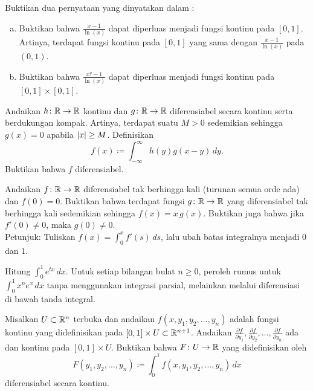 \begin{exercise} \label{exercise:counterexamplediffunder}
Buktikan dua pernyataan yang dinyatakan dalam
:
\begin{enumerate}[a)]
\item
Buktikan bahwa $\frac{x-1}{\ln(x)}$ dapat diperluas menjadi fungsi kontinu pada
$[0,1]$.  Artinya, terdapat fungsi kontinu pada $[0,1]$
yang sama dengan $\frac{x-1}{\ln(x)}$ pada $(0,1)$.
\item
Buktikan bahwa $\frac{x^y-1}{\ln(x)}$ dapat diperluas menjadi fungsi kontinu
pada $[0,1] \times [0,1]$.
\end{enumerate}
\end{exercise}

\begin{exercise}
Andaikan $h \colon {\mathbb{R}} \to {\mathbb{R}}$ kontinu dan $g
\colon {\mathbb{R}} \to {\mathbb{R}}$ diferensiabel secara kontinu serta berdukungan
kompak.  Artinya, terdapat suatu $M > 0$ sedemikian sehingga $g(x) = 0$ apabila
$\lvert {x} \rvert \geq M$.  Definisikan
\begin{equation*}
f(x) \coloneqq \int_{-\infty}^\infty h(y)g(x-y)\,dy  .
\end{equation*}
Buktikan bahwa $f$ diferensiabel.
\end{exercise}

\begin{exercise}
Andaikan $f \colon {\mathbb{R}} \to {\mathbb{R}}$ diferensiabel tak berhingga kali (turunan
semua orde ada)
dan $f(0) = 0$.  Buktikan bahwa terdapat fungsi $g \colon {\mathbb{R}} \to {\mathbb{R}}$ yang
diferensiabel tak berhingga kali sedemikian sehingga $f(x) = x\,g(x)$.
Buktikan juga bahwa
jika $f'(0) \neq 0$, maka $g(0) \neq 0$.\\
Petunjuk: Tuliskan
$f(x) = \int_0^x f'(s) \,ds$, lalu ubah batas integralnya menjadi $0$ dan $1$.
\end{exercise}

\begin{exercise}
Hitung $\int_0^1 e^{tx} \,dx$.  Untuk setiap bilangan bulat $n \geq 0$, peroleh rumus untuk
$\int_0^1 x^n e^{x} \,dx$ tanpa menggunakan integrasi parsial, melainkan
melalui diferensiasi di bawah tanda integral.
\end{exercise}

\begin{exercise}
Misalkan $U \subset {\mathbb{R}}^n$ terbuka dan andaikan
$f(x,y_1,y_2,\ldots,y_n)$ adalah fungsi kontinu
yang didefinisikan pada $[0,1] \times U \subset {\mathbb{R}}^{n+1}$.
Andaikan
$\frac{\partial f}{\partial y_1},
\frac{\partial f}{\partial y_2},\ldots,
\frac{\partial f}{\partial y_n}$
ada dan kontinu pada $[0,1] \times U$.
Buktikan bahwa $F \colon U \to {\mathbb{R}}$ yang didefinisikan oleh
\begin{equation*}
F(y_1,y_2,\ldots,y_n) \coloneqq
\int_0^1
f(x,y_1,y_2,\ldots,y_n)
\, dx
\end{equation*}
diferensiabel secara kontinu.
\end{exercise}

